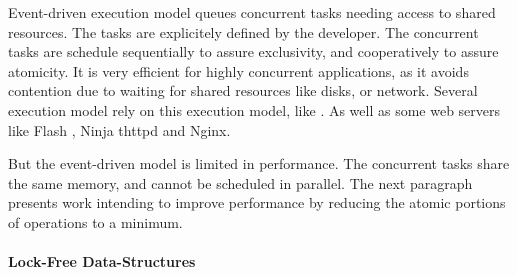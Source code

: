 Event-driven execution model queues concurrent tasks needing access to shared resources.
The tasks are explicitely defined by the developer.
The concurrent tasks are schedule sequentially to assure exclusivity, and cooperatively to assure atomicity.
It is very efficient for highly concurrent applications, as it avoids contention due to waiting for shared resources like disks, or network.
Several execution model rely on this execution model, like .
As well as some web servers like Flash \cite{Pai1999}, Ninja \cite{Gribble2001} thttpd and Nginx.





But the event-driven model is limited in performance.
The concurrent tasks share the same memory, and cannot be scheduled in parallel.
The next paragraph presents work intending to improve performance by reducing the atomic portions of operations to a minimum. %

\paragraph{Lock-Free Data-Structures}

